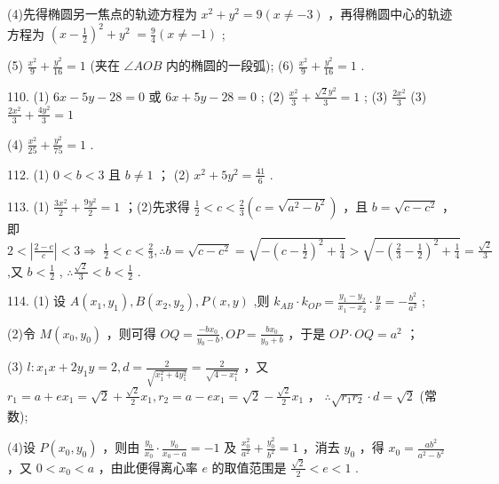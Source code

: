 \documentclass[10pt]{article}
\begin{document}
(4)先得椭圆另一焦点的轨迹方程为 \({x}^{2} + {y}^{2} = 9\left( {x \neq   - 3}\right)\) ，再得椭圆中心的轨迹方程为 \({\left( x - \frac{1}{2}\right) }^{2} + {y}^{2} \; = \frac{9}{4}\left( {x \neq   - 1}\right)\) ;

(5) \(\frac{{x}^{2}}{9} + \frac{{y}^{2}}{16} = 1\) (夹在 \(\angle {AOB}\) 内的椭圆的一段弧); (6) \(\frac{{x}^{2}}{9} + \frac{{y}^{2}}{16} = 1\) .

110. (1) \({6x} - {5y} - {28} = 0\) 或 \({6x} + {5y} - {28} = 0\) ; (2) \(\frac{{x}^{2}}{3} + \frac{\sqrt{2}{y}^{2}}{3} = 1\) ; (3) \(\frac{2{x}^{2}}{3}\) (3) \(\frac{2{x}^{2}}{3} + \frac{4{y}^{2}}{3} = 1\)

(4) \(\frac{{x}^{2}}{25} + \frac{{y}^{2}}{75} = 1\) .

112. (1) \(0 < b < 3\) 且 \(b \neq  1\) ； (2) \({x}^{2} + 5{y}^{2} = \frac{41}{6}\) .

113. (1) \(\frac{3{x}^{2}}{2} + \frac{9{y}^{2}}{2} = 1\) ；(2)先求得 \(\frac{1}{2} < c < \frac{2}{3}\left( {c = \sqrt{{a}^{2} - {b}^{2}}}\right)\) ，且 \(b = \sqrt{c - {c}^{2}}\) ，即 \(2 < \left| \frac{2 - c}{c}\right|  < 3 \Rightarrow \; \frac{1}{2} < c < \frac{2}{3},\therefore b = \sqrt{c - {c}^{2}} = \sqrt{-{\left( c - \frac{1}{2}\right) }^{2} + \frac{1}{4}} > \sqrt{-{\left( \frac{2}{3} - \frac{1}{2}\right) }^{2} + \frac{1}{4}} = \frac{\sqrt{2}}{3}\) ,又 \(b < \frac{1}{2}\) , \(\therefore \frac{\sqrt{2}}{3} < b < \frac{1}{2}\) .

114. (1) 设 \(A\left( {{x}_{1},{y}_{1}}\right) ,B\left( {{x}_{2},{y}_{2}}\right) ,P\left( {x,y}\right)\) ,则 \({k}_{AB} \cdot  {k}_{OP} = \frac{{y}_{1} - {y}_{2}}{{x}_{1} - {x}_{2}} \cdot  \frac{y}{x} =  - \frac{{b}^{2}}{{a}^{2}}\) ;

(2)令 \(M\left( {{x}_{0},{y}_{0}}\right)\) ，则可得 \({OQ} = \frac{-{b{x}_{0}}}{{y}_{0} - b},{OP} = \frac{b{x}_{0}}{{y}_{0} + b}\) ，于是 \({OP} \cdot  {OQ} = {a}^{2}\) ；

(3) \(l : {x}_{1}x + 2{y}_{1}y = 2,d = \frac{2}{\sqrt{{x}_{1}^{2} + 4{y}_{1}^{2}}} = \frac{2}{\sqrt{4 - {x}_{1}^{2}}}\) ，又 \({r}_{1} = a + e{x}_{1} = \sqrt{2} + \frac{\sqrt{2}}{2}{x}_{1},{r}_{2} = a - e{x}_{1} = \sqrt{2} - \frac{\sqrt{2}}{2}{x}_{1}\) ， \(\therefore \sqrt{{r}_{1}{r}_{2}} \cdot  d = \sqrt{2}\) (常数);

(4)设 \(P\left( {{x}_{0},{y}_{0}}\right)\) ，则由 \(\frac{{y}_{0}}{{x}_{0}} \cdot  \frac{{y}_{0}}{{x}_{0} - a} =  - 1\) 及 \(\frac{{x}_{0}^{2}}{{a}^{2}} + \frac{{y}_{0}^{2}}{{b}^{2}} = 1\) ，消去 \({y}_{0}\) ，得 \({x}_{0} = \frac{a{b}^{2}}{{a}^{2} - {b}^{2}}\) ，又 \(0 < {x}_{0} < a\) ，由此便得离心率 \(e\) 的取值范围是 \(\frac{\sqrt{2}}{2} < e < 1\) .
\end{document}
